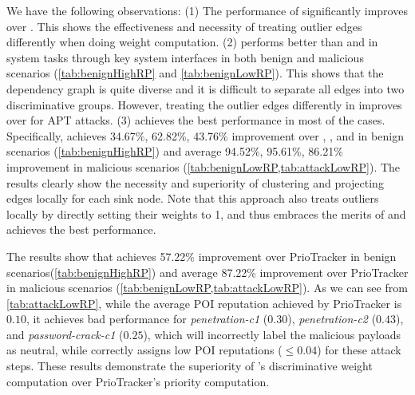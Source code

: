 We have the following observations:
(1) The performance of \lpglobalplus significantly improves over \lpglobal.
This shows the effectiveness and necessity of treating outlier edges differently when doing weight computation. 
(2) \lpfixed performs better than \lpglobal and \lpglobalplus in system tasks through key system interfaces in both benign and malicious scenarios (\cref{tab:benignHighRP} and \cref{tab:benignLowRP}).
This shows that the dependency graph is quite diverse and it is difficult to separate all edges into two discriminative groups.
However, treating the outlier edges differently in \lpglobalplus improves over \lpfixed for APT attacks.
(3) \tool achieves the best performance in most of the cases. Specifically, \tool achieves 34.67\%, 62.82\%, 43.76\% improvement over \lpfixed, \lpglobal, and \lpglobalplus in benign scenarios (\cref{tab:benignHighRP}) and average 94.52\%, 95.61\%, 86.21\% improvement in malicious scenarios (\cref{tab:benignLowRP,tab:attackLowRP}).
The results clearly show the necessity and superiority of clustering and projecting edges locally for each sink node.
Note that this approach also treats outliers locally by directly setting their weights to 1, and thus \tool embraces the merits of \lpglobalplus and achieves the best performance.


The results show that \tool achieves 57.22\% improvement over PrioTracker in benign scenarios(\cref{tab:benignHighRP}) and average 87.22\% improvement over PrioTracker in malicious scenarios (\cref{tab:benignLowRP,tab:attackLowRP}).
As we can see from \cref{tab:attackLowRP}, while the average POI reputation achieved by PrioTracker is $0.10$, it achieves bad performance for \textit{penetration-c1} ($0.30$), \textit{penetration-c2} ($0.43$), and \textit{password-crack-c1} ($0.25$),
which will incorrectly label the malicious payloads as neutral,
while \tool correctly assigns low POI reputations ($\leq 0.04$) for these attack steps.
These results demonstrate the superiority of \tool's discriminative weight computation over PrioTracker's priority computation.

